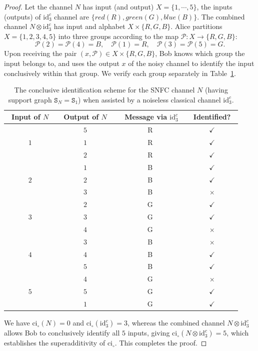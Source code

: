 \documentclass[12pt,a4paper]{article}
\begin{document}
\begin{proof}
Let the channel $N$ has input (and output) $X=\{1,\cdots,5\}$, the inputs (outputs) of $\mathrm{id}^c_3$ channel are $\{red (R), green (G), blue (B)\}$. The combined channel $N \otimes \mathrm{id}^c_3$ has input and alphabet $X \times \{R,G,B\}$. Alice partitions $X = \{1,2,3,4,5\}$ into three groups according to the map $\mathcal{P}: X \to \{R,G,B\}$:
\begin{equation*}
\mathcal{P}(2)= \mathcal{P}(4)= B,\quad \mathcal{P}(1) = R, \quad \mathcal{P}(3) = \mathcal{P}(5) = G.
\end{equation*}
Upon receiving the pair $(x, \mathcal{P})\in X\times\{R,G,B\}$, Bob knows which group the input belongs to, and uses the output $x$ of the noisy channel to identify the input conclusively within that group. We verify each group separately in Table~\ref{tab1}.

\begin{table}[t]
\centering
\begin{tabular}{c|c|c|c}
\hline
~Input of $N$~ & ~Output of $N$~ &~ Message via $\mathrm{id}^c_3$~ & ~Identified?~ \\
\hline\hline
\multirow{3}{*}{$1$} 
& $5$ & R & $\checkmark$ \\
& $1$ & R & $\checkmark$ \\
& $2$ & R & $\checkmark$ \\
\hline
\multirow{3}{*}{$2$} 
& $1$ & B & $\checkmark$ \\
& $2$ & B & $\checkmark$ \\
& $3$ & B & $\times$ \\
\hline
\multirow{3}{*}{$3$} 
& $2$ & G & $\checkmark$ \\
& $3$ & G & $\checkmark$ \\
& $4$ & G & $\times$ \\
\hline
\multirow{3}{*}{$4$} 
& $3$ & B & $\times$ \\
& $4$ & B & $\checkmark$ \\
& $5$ & B & $\checkmark$ \\
\hline
\multirow{3}{*}{$5$} 
& $4$ & G & $\times$ \\
& $5$ & G & $\checkmark$ \\
& $1$ & G & $\checkmark$ \\
\hline
\end{tabular}
\caption{The conclusive identification scheme for the SNFC channel $N$ (having support graph $\mathtt{S}_{N}=\mathtt{S}_1$) when assisted by a noiseless classical channel $\mathrm{id}^c_3$. }
\label{tab1}
\end{table}
\noindent We have $\mathrm{ci}_\circ(N) = 0$ and $\mathrm{ci}_\circ(\mathrm{id}^c_3) = 3$, whereas the combined channel $N \otimes \mathrm{id}^c_3$ allows Bob to conclusively identify all $5$ inputs, giving $\mathrm{ci}_\circ(N \otimes \mathrm{id}^c_3) = 5$, 
which establishes the superadditivity of $\mathrm{ci}_\circ$. This completes the proof. 
\end{proof}
\end{document}
